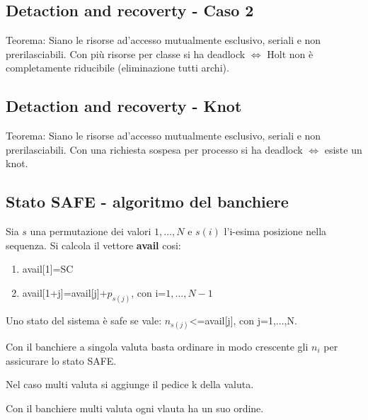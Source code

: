 \subsection{Detaction and recoverty - Caso 2}
Teorema: Siano le risorse ad'accesso mutualmente esclusivo, seriali e non prerilasciabili. Con più risorse per classe si ha deadlock $\iff$ Holt non è completamente riducibile (eliminazione tutti archi).

\subsection{Detaction and recoverty - Knot}
Teorema: Siano le risorse ad'accesso mutualmente esclusivo, seriali e non prerilasciabili. Con una richiesta sospesa per processo si ha deadlock $\iff$ esiste un knot.

\subsection{Stato SAFE - algoritmo del banchiere}
Sia $s$ una permutazione dei valori $1,\dots,N$ e $s(i)$ l'i-esima posizione nella sequenza. Si calcola il vettore \textbf{avail} cosi:
\begin{enumerate}
	\item avail[1]=SC
	\item avail[1+j]=avail[j]+$p_{s(j)}$, con i=$1,\dots,N-1$
\end{enumerate}
Uno stato del sistema è safe se vale: $n_{s(j)}$<=avail[j], con j=1,$\dots$,N.

Con il banchiere a singola valuta basta ordinare in modo crescente gli $n_i$ per assicurare lo stato SAFE.

Nel caso multi valuta si aggiunge il pedice k della valuta.

Con il banchiere multi valuta ogni vlauta ha un suo ordine.